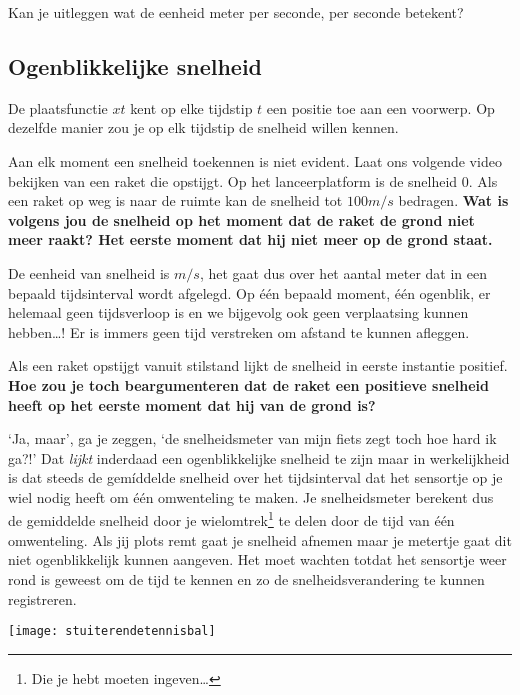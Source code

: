 \documentclass{ximera}
\begin{document}
\begin{denkvraag}
Kan je uitleggen wat de eenheid meter per seconde, per seconde betekent? 
\end{denkvraag}

\subsection{Ogenblikkelijke snelheid}

De plaatsfunctie \(x{t}\) kent op elke tijdstip \(t\) een positie toe aan een voorwerp. Op dezelfde manier zou je op elk tijdstip de snelheid willen kennen. 

\begin{denkvraag}
Aan elk moment een snelheid toekennen is niet evident. Laat ons volgende video bekijken van een raket die opstijgt. Op het lanceerplatform is de snelheid \(0\). Als een raket op weg is naar de ruimte kan de snelheid tot \(100 m/s \) bedragen. \textbf{Wat is volgens jou de snelheid op het moment dat de raket de grond niet meer raakt? Het eerste moment dat hij niet meer op de grond staat.}
\end{denkvraag}

De eenheid van snelheid is \(m/s\), het gaat dus over het aantal meter dat in een bepaald tijds\-in\-ter\-val wordt afgelegd. Op \'e\'en bepaald moment, \'e\'en ogenblik, er helemaal geen tijdsverloop is en we bijgevolg ook geen verplaatsing kunnen hebben\ldots! Er is immers geen tijd verstreken om afstand te kunnen afleggen.

\begin{denkvraag}
Als een raket opstijgt vanuit stilstand lijkt de snelheid in eerste instantie positief. \textbf{Hoe zou je toch beargumenteren dat de raket een positieve snelheid heeft op het eerste moment dat hij van de grond is?}

\end{denkvraag}

`Ja, maar', ga je zeggen, `de snelheidsmeter van mijn fiets zegt toch hoe hard ik ga?!' Dat \emph{lijkt} inderdaad een ogenblikkelijke snelheid te zijn maar in werkelijkheid is dat steeds de gem\'iddelde snelheid over het \mbox{tijds}\-in\-ter\-val dat het sensortje op je wiel nodig heeft om \'e\'en omwenteling te maken. Je snelheidsmeter berekent dus de gemiddelde snelheid door je wielomtrek\footnote{Die je hebt moeten ingeven\ldots} te delen door de tijd van \'e\'en omwenteling. Als jij plots remt gaat je snelheid afnemen maar je metertje gaat dit niet ogenblikkelijk kunnen aangeven. Het moet wachten totdat het sensortje weer rond is geweest om de tijd te kennen en zo de snelheidsverandering te kunnen registreren.
\begin{image}

\texttt{[image: stuiterendetennisbal]}
\end{image}
\end{document}
